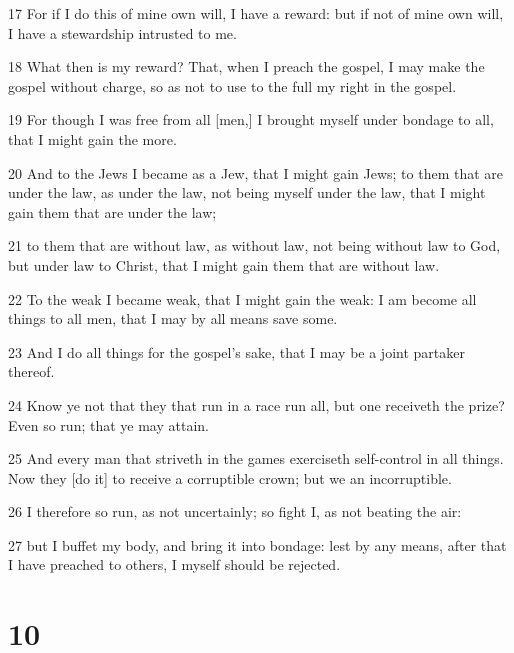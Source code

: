 \par 17 For if I do this of mine own will, I have a reward: but if not of mine own will, I have a stewardship intrusted to me.
\par 18 What then is my reward? That, when I preach the gospel, I may make the gospel without charge, so as not to use to the full my right in the gospel.
\par 19 For though I was free from all [men,] I brought myself under bondage to all, that I might gain the more.
\par 20 And to the Jews I became as a Jew, that I might gain Jews; to them that are under the law, as under the law, not being myself under the law, that I might gain them that are under the law;
\par 21 to them that are without law, as without law, not being without law to God, but under law to Christ, that I might gain them that are without law.
\par 22 To the weak I became weak, that I might gain the weak: I am become all things to all men, that I may by all means save some.
\par 23 And I do all things for the gospel's sake, that I may be a joint partaker thereof.
\par 24 Know ye not that they that run in a race run all, but one receiveth the prize? Even so run; that ye may attain.
\par 25 And every man that striveth in the games exerciseth self-control in all things. Now they [do it] to receive a corruptible crown; but we an incorruptible.
\par 26 I therefore so run, as not uncertainly; so fight I, as not beating the air:
\par 27 but I buffet my body, and bring it into bondage: lest by any means, after that I have preached to others, I myself should be rejected.

\chapter{10}

